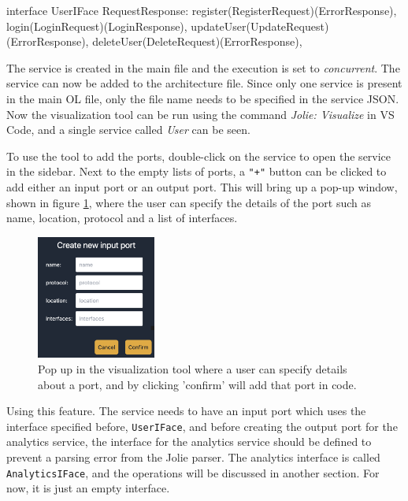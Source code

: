 \begin{jolisting}[][caption={The interface for the user service}, label={lst:useriface}]
interface UserIFace {
    RequestResponse:
        register(RegisterRequest)(ErrorResponse),
        login(LoginRequest)(LoginResponse),
        updateUser(UpdateRequest)(ErrorResponse),
        deleteUser(DeleteRequest)(ErrorResponse),
}
\end{jolisting}

The service is created in the main file and the execution is set to \textit{concurrent}.
The service can now be added to the architecture file. Since only one service is present in the main OL file, only the file name needs to be specified in the service JSON.
Now the visualization tool can be run using the command \textit{Jolie: Visualize} in VS Code, and a single service called \textit{User} can be seen.

To use the tool to add the ports, double-click on the service to open the service in the sidebar. Next to the empty lists of ports, a \texttt{"+"} button can be clicked to add either an input port or an output port.
This will bring up a pop-up window, shown in figure \ref*{figure:popup_create_inputport}, where the user can specify the details of the port such as name, location, protocol and a list of interfaces.
\begin{figure}[h!]
    \center
    \includegraphics[width=0.35\textwidth]{figures/popup_create_inputport.png}
    \caption{Pop up in the visualization tool where a user can specify details about a port, and by clicking 'confirm' will add that port in code.}
    \label{figure:popup_create_inputport}
\end{figure}

Using this feature. The service needs to have an input port which uses the interface specified before, \texttt{UserIFace}, and before creating the output port for the analytics service, the interface for the analytics service should be defined to prevent a parsing error from the Jolie parser. 
The analytics interface is called \texttt{AnalyticsIFace}, and the operations will be discussed in another section. For now, it is just an empty interface.

